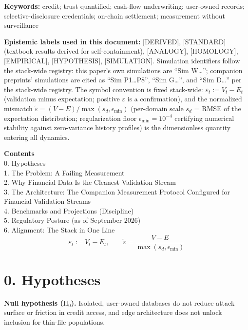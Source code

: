 \documentclass[
]{article}
\begin{document}
\textbf{Keywords:} credit; trust quantified; cash-flow underwriting;
user-owned records; selective-disclosure credentials; on-chain
settlement; measurement without surveillance

\textbf{Epistemic labels used in this document:} {[}DERIVED{]},
{[}STANDARD{]} (textbook results derived for self-containment),
{[}ANALOGY{]}, {[}HOMOLOGY{]}, {[}EMPIRICAL{]}, {[}HYPOTHESIS{]},
{[}SIMULATION{]}. Simulation identifiers follow the stack-wide registry:
this paper's own simulations are ``Sim W\ldots{}''; companion preprints'
simulations are cited as ``Sim P1\ldots P8'', ``Sim G\ldots{}'', and
``Sim D\ldots{}'' per the stack-wide registry. The symbol convention is
fixed stack-wide: \textbf{\(\varepsilon_t := V_t - E_t\)} (validation
minus expectation; positive \(\varepsilon\) is a confirmation), and the
normalized mismatch
\(\tilde{\varepsilon} = (V - E)/\max(s_d, \epsilon_{\min})\) (per-domain
scale \(s_d\) = RMSE of the expectation distribution; regularization
floor \(\epsilon_{\min} = 10^{-4}\) certifying numerical stability
against zero-variance history profiles) is the dimensionless quantity
entering all dynamics.

\textbf{Contents}\\
0. Hypotheses\\
1. The Problem: A Failing Measurement\\
2. Why Financial Data Is the Cleanest Validation Stream\\
3. The Architecture: The Companion Measurement Protocol Configured for
Financial Validation Streams\\
4. Benchmarks and Projections (Discipline)\\
5. Regulatory Posture (as of September 2026)\\
6. Alignment: The Stack in One Line\\

\begin{equation}
\varepsilon_t := V_t - E_t, \qquad \tilde{\varepsilon} = \frac{V - E}{\max(s_d, \epsilon_{\min})}
\label{eq:epsilon}
\end{equation}

\section{0. Hypotheses}\label{hypotheses}

\textbf{Null hypothesis (\(\mathrm{H}_0\)).} Isolated, user-owned
databases do not reduce attack surface or friction in credit access, and
edge architecture does not unlock inclusion for thin-file populations.
\end{document}
